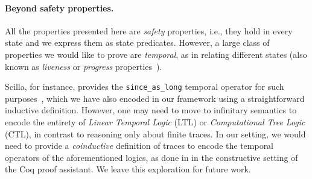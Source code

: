 \paragraph{Beyond safety properties.}
All the properties presented here are \textit{safety} properties, i.e., they hold in every state and we express them as state predicates.
However, a large class of properties we would like to prove are \textit{temporal}, as in relating different states (also known as \textit{liveness} or \textit{progress} properties~\cite{manna-pnueli,baier-katoen}).

Scilla, for instance, provides the \texttt{since\_as\_long} temporal operator for such purposes~\cite{scilla},
which we have also encoded in our framework using a straightforward inductive definition.
However, one may need to move to infinitary semantics to encode the entirety of \textit{Linear Temporal Logic} (LTL)
or \textit{Computational Tree Logic} (CTL), in contrast to reasoning only about finite traces.
In our setting, we would need to provide a \textit{coinductive} definition of traces
to encode the temporal operators of the aforementioned logics,
as done in \cite{infinite-trees} in the constructive setting of the Coq proof assistant.
We leave this exploration for future work.

